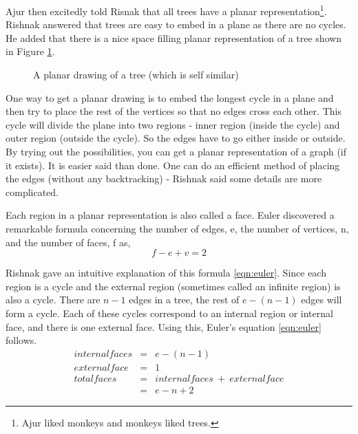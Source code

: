  Ajur then excitedly told Risnak that all trees have a planar representation\footnote{Ajur liked monkeys and monkeys liked trees.}. Rishnak answered that trees are easy to embed in a plane as there are
 no cycles. He added that there is a nice space filling planar representation of a tree shown in Figure \ref{9g7}.
\begin{figure}
\begin{center}    

  \caption{ A planar drawing of a tree (which is self similar)}\label{9g7}
  \end{center}
\end{figure}

One way to get a planar drawing is to embed the longest cycle in a plane and then try to place the rest of the vertices so that no edges cross each other. This cycle will divide the plane into two regions - inner region (inside the cycle) and outer region (outside the cycle). So the edges have to go either inside or outside. By trying out the possibilities, you can get a planar representation of a graph (if it exists). It is easier said than done. One can do an efficient method of placing the edges (without any backtracking) - Rishnak said some details are more complicated. 

Each region in a planar representation is also called a face. Euler discovered a remarkable formula concerning the number of edges, e, the number of vertices, n, and the number of faces, f as,
\begin{equation}
\label{eqn:euler}
  f-e+v=2 
\end{equation}

 

Rishnak gave an intuitive explanation of this formula \ref{eqn:euler}. Since each region is a cycle and the external region (sometimes called an infinite region) is also a cycle. 
There are $n-1$ edges in a tree, the rest of $e-(n-1)$ edges will form a cycle. Each of these cycles correspond to an internal region or internal face, and there is one external face. Using this, Euler's equation \ref{eqn:euler} follows.
\begin{eqnarray}
    \label{eqn:cycles}
    internal faces&=&e-(n-1)\nonumber\\
    external face&=&1 \nonumber \\
    total faces&=& internal faces~+~external face \nonumber \\
    &=&e-n+2
\end{eqnarray}

